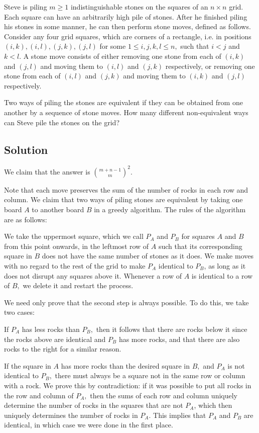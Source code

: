 \documentclass{article}
\begin{document}
Steve is piling $m \geq 1$ indistinguishable stones on the squares of an $n \times n$ grid. Each square can have an arbitrarily high pile of stones. After he finished piling his stones in some manner, he can then perform stone moves, defined as follows. Consider any four grid squares, which are corners of a rectangle, i.e. in positions $(i, k),(i, l),(j, k),(j, l)$ for some $1 \leq i, j, k, l \leq n,$ such that $i<j$ and $k<l .$ A stone move consists of either removing one stone from each of $(i, k)$ and $(j, l)$ and moving them to $(i, l)$ and $(j, k)$ respectively, or removing one stone from each of $(i, l)$ and $(j, k)$ and moving them to $(i, k)$ and $(j, l)$ respectively.

Two ways of piling the stones are equivalent if they can be obtained from one another by a sequence of stone moves. How many different non-equivalent ways can Steve pile the stones on the grid?

\subsection{Solution}

We claim that the answer is $\binom{m+n-1}{m}^2.$

Note that each move preserves the sum of the number of rocks in each row and column. We claim that two ways of piling stones are equivalent by taking one board $A$ to another board $B$ in a greedy algorithm. The rules of the algorithm are as follows:

\begin{itemize}
\Item We take the uppermost square, which we call $P_A$ and $P_B$ for squares $A$ and $B$ from this point onwards, in the leftmost row of $A$ such that its corresponding square in $B$ does not have the same number of stones as it does.
\Item We make moves with no regard to the rest of the grid to make $P_A$ identical to $P_B$, as long as it does not disrupt any squares above it.
\Item Whenever a row of $A$ is identical to a row of $B,$ we delete it and restart the process.
\end{itemize}

We need only prove that the second step is always possible. To do this, we take two cases:
\begin{itemize}
\Item If $P_A$ has less rocks than $P_B,$ then it follows that there are rocks below it since the rocks above are identical and $P_B$ has more rocks, and that there are also rocks to the right for a similar reason.

\Item If the square in $A$ has more rocks than the desired square in $B,$ and $P_A$ is not identical to $P_B,$ there must always be a square not in the same row or column with a rock. We prove this by contradiction: if it was possible to put all rocks in the row and column of $P_A,$ then the sums of each row and column uniquely determine the number of rocks in the squares that are not $P_A$, which then uniquely determines the number of rocks in $P_A.$ This implies that $P_A$ and $P_B$ are identical, in which case we were done in the first place.
\end{itemize}
\end{document}
